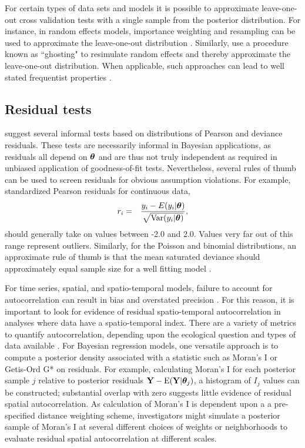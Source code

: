 \documentclass[12pt,english]{article}
\begin{document}
\begin{spacing}{1.9}
For certain types of data sets and models it is possible to
approximate leave-one-out cross validation tests with a single sample
from the posterior distribution.  For instance, in random effects
models, importance weighting and resampling can be used to approximate
the leave-one-out distribution
\citep{SternCressie2000,QiuEtAl2016}. Similarly,
\citet{MarshallSpiegelhalter2007} use a procedure known as ``ghosting"
to resimulate random effects and thereby approximate the leave-one-out
distribution.  When applicable, such approaches can lead to well
stated frequentist properties \citep[i.e., a uniform distribution of
p-values under the null;][]{QiuEtAl2016}.

\subsection{Residual tests}

\citet{LunnEtAl2013} suggest several informal tests based on
distributions of Pearson and deviance residuals.  These tests are
necessarily informal in Bayesian applications, as residuals all depend
on $\boldsymbol{\theta}$ and are thus not truly independent as required in
unbiased application of goodness-of-fit tests.  Nevertheless, several
rules of thumb can be used to screen residuals for obvious assumption
violations.  For example, standardized Pearson residuals for
continuous data,
\begin{eqnarray*}
  r_i & = & \frac{y_i - E(y_i|\boldsymbol{\theta})}{\sqrt{\textrm{Var}(y_i | \boldsymbol{\theta})}},
\end{eqnarray*}
should generally take on values between -2.0 and 2.0.  Values very far
out of this range represent outliers.  Similarly, for the Poisson and
binomial distributions, an approximate rule of thumb is that the mean
saturated deviance should approximately equal sample size for a well
fitting model \citep{LunnEtAl2013}.

For time series, spatial, and spatio-temporal models, failure to
account for autocorrelation can result in bias and overstated
precision \citep{LichsteinEtAl2002}.  For this reason, it is important
to look for evidence of residual spatio-temporal autocorrelation in
analyses where data have a spatio-temporal index.  There are a variety
of metrics to quantify autocorrelation, depending upon the ecological
question and types of data available \cite[e.g.,][]{PerryEtAl2002}.
For Bayesian regression models, one versatile approach is to compute a
posterior density associated with a statistic such as Moran's I
\citep{Moran1950} or Getis-Ord G* \citep{GetisOrd1992} on residuals.
For example, calculating Moran's I for each posterior sample $j$
relative to posterior residuals
${\bf Y} - \textrm{E}({\bf Y} | \boldsymbol{\theta}_j)$, a histogram
of $I_j$ values can be constructed; substantial overlap with zero
suggests little evidence of residual spatial autocorrelation.  As
calculation of Moran's I is dependent upon a a pre-specified distance
weighting scheme, investigators might simulate a posterior sample of
Moran's I at several different choices of weights or neighborhoods to
evaluate residual spatial autocorrelation at different scales.


\end{spacing}
\end{document}
